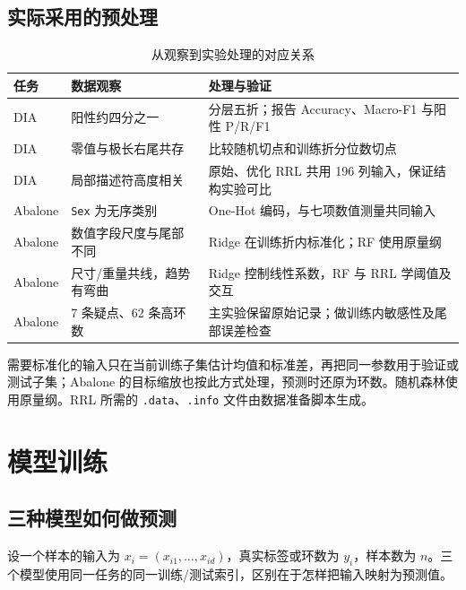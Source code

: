 \documentclass[UTF8,a4paper,11pt]{ctexart}
\begin{document}
\subsection{实际采用的预处理}

\begin{table}[!htbp]
\centering\small
\caption{从观察到实验处理的对应关系}
\label{tab:preprocess}
\begin{tabularx}{\linewidth}{@{}p{24mm}Y Y@{}}
\toprule
任务 & 数据观察 & 处理与验证 \\
\midrule
DIA & 阳性约四分之一 & 分层五折；报告 Accuracy、Macro-F1 与阳性 P/R/F1 \\
DIA & 零值与极长右尾共存 & 比较随机切点和训练折分位数切点 \\
DIA & 局部描述符高度相关 & 原始、优化 RRL 共用 196 列输入，保证结构实验可比 \\
Abalone & \texttt{Sex} 为无序类别 & One-Hot 编码，与七项数值测量共同输入 \\
Abalone & 数值字段尺度与尾部不同 & Ridge 在训练折内标准化；RF 使用原量纲 \\
Abalone & 尺寸/重量共线，趋势有弯曲 & Ridge 控制线性系数，RF 与 RRL 学阈值及交互 \\
Abalone & 7 条疑点、62 条高环数 & 主实验保留原始记录；做训练内敏感性及尾部误差检查 \\
\bottomrule
\end{tabularx}
\end{table}

需要标准化的输入只在当前训练子集估计均值和标准差，再把同一参数用于验证或测试子集；Abalone 的目标缩放也按此方式处理，预测时还原为环数。随机森林使用原量纲。RRL 所需的 \texttt{.data}、\texttt{.info} 文件由数据准备脚本生成。

\section{模型训练}
\subsection{三种模型如何做预测}

设一个样本的输入为 $x_i=(x_{i1},\ldots,x_{id})$，真实标签或环数为 $y_i$，样本数为 $n$。三个模型使用同一任务的同一训练/测试索引，区别在于怎样把输入映射为预测值。
\end{document}
